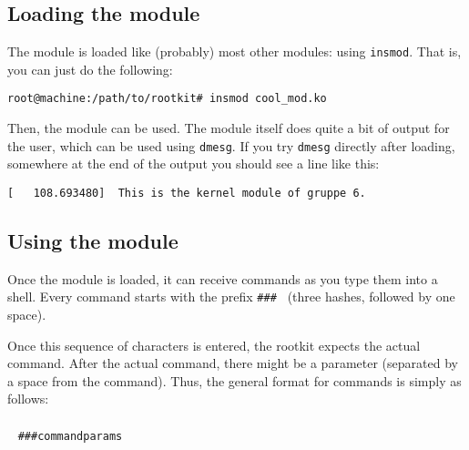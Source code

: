 \documentclass[10pt, letterpaper]{article}
\begin{document}
\subsection{Loading the module}

The module is loaded like (probably) most other modules: using \texttt{insmod}. That is, you can just do the following:

\begin{verbatim}
root@machine:/path/to/rootkit# insmod cool_mod.ko
\end{verbatim}

Then, the module can be used. The module itself does quite a bit of output for the user, which can be used using \texttt{dmesg}. If you try \texttt{dmesg} directly after loading, somewhere at the end of the output you should see a line like this:

\begin{verbatim}
[   108.693480]  This is the kernel module of gruppe 6.
\end{verbatim}

\subsection{Using the module}

\label{sec:using-the-module}

Once the module is loaded, it can receive commands as you type them into a shell. Every command starts with the prefix \texttt{\#\#\# } (three hashes, followed by one space).

Once this sequence of characters is entered, the rootkit expects the actual command. After the actual command, there might be a parameter (separated by a space from the command). Thus, the general format for commands is simply as follows:
\\~
\\~
\texttt{\#\#\#\textvisiblespace command\textvisiblespace params\textvisiblespace
}
\end{document}
